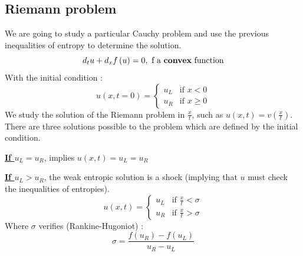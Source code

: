     \subsection{Riemann problem}
        We are going to study a particular Cauchy problem and use the previous inequalities of entropy to determine the solution.
        \begin{equation}
            d_t u + d_x f\left(u\right) = 0,\text{ f a {\bf convex} function}
        \end{equation}
        With the initial condition :
        \begin{equation*}
                u\left(x,t=0\right) = 
                 \begin{cases}
                    u_L & \text{if $x < 0$}\\
                    u_R & \text{if $x \geq 0$}
                \end{cases}  
        \end{equation*}
        We study the solution of the Riemann problem in $\frac{x}{t}$, such as $u\left(x,t\right) = v\left(\frac{x}{t}\right)$.
        There are three solutions possible to the problem which are defined by the initial condition.
        
        \underline{\boldmath \bf If $u_L = u_R$}, implies $ \boxed{u\left(x,t\right) = u_L = u_R}$
        
        \underline{\boldmath \bf If $u_L > u_R$}, the weak entropic solution is a shock (implying that $u$ must check the inequalities of entropies).
        \begin{equation}
                 \boxed{
                u\left(x,t\right) = 
                 \begin{cases}
                    u_L & \text{if $\frac{x}{t} < \sigma $}\\
                    u_R & \text{if $\frac{x}{t} > \sigma $}
                \end{cases}
                }
        \end{equation}
        Where $\sigma$ verifies (Rankine-Hugoniot) :
        \begin{equation*}
            \sigma = \frac{f\left(u_R\right) - f\left(u_L\right)}{u_R - u_L}
        \end{equation*}
        
